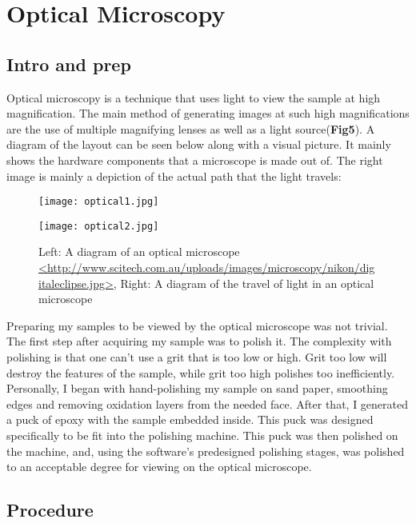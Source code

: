 \documentclass{article}
\begin{document}
\section{Optical Microscopy}

\subsection{Intro and prep}

Optical microscopy is a technique that uses light to view the sample at high magnification. The main method of generating images at such high magnifications are the use of multiple magnifying lenses as well as a light source(\textbf{Fig5}). A diagram of the layout can be seen below along with a visual picture. It mainly shows the hardware components that a microscope is made out of. The right image is mainly a depiction of the actual path that the light travels:

\begin{figure}[h]
	\begin{minipage}{.5\textwidth}
		\centering
		\texttt{[image: optical1.jpg]}
	\end{minipage}		
	\begin{minipage}{.5\textwidth}
		\centering
		\texttt{[image: optical2.jpg]}
	\end{minipage}
	\caption{Left: A diagram of an optical microscope \url{<http://www.scitech.com.au/uploads/images/microscopy/nikon/digitaleclipse.jpg>}, Right: A diagram of the travel of light in an optical microscope}
\end{figure}

Preparing my samples to be viewed by the optical microscope was not trivial. The first step after acquiring my sample was to polish it. The complexity with polishing is that one can't use a grit that is too low or high. Grit too low will destroy the features of the sample, while grit too high polishes too inefficiently. Personally, I began with hand-polishing my sample on sand paper, smoothing edges and removing oxidation layers from the needed face. After that, I generated a puck of epoxy with the sample embedded inside. This puck was designed specifically to be fit into the polishing machine. This puck was then polished on the machine, and, using the software's predesigned polishing stages, was polished to an acceptable degree for viewing on the optical microscope.

\subsection{Procedure}
\end{document}
